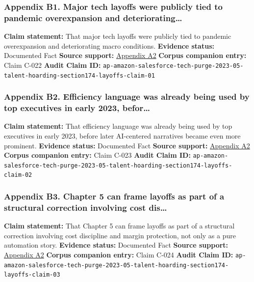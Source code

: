 \documentclass[
  american,
  11pt,
  letterpaper,
]{article}
\begin{document}
\subsubsection{Appendix B1. Major tech layoffs were publicly tied to
pandemic overexpansion and
deteriorating\ldots{}}\label{appendix-b1-major-tech-layoffs-were-publicly-tied-to-pandemic-overexpansion-and-deteriorating}

\textbf{Claim statement:} That major tech layoffs were publicly tied to
pandemic overexpansion and deteriorating macro conditions.
\textbf{Evidence status:} Documented Fact \textbf{Source support:}
\hyperref[appendix-a2-amazon-salesforce-jettison-jobs-in-latest-tech-worker-purge]{Appendix
A2} \textbf{Corpus companion entry:} Claim C-022 \textbf{Audit Claim
ID:}
\texttt{ap-amazon-salesforce-tech-purge-2023-05-talent-hoarding-section174-layoffs-claim-01}

\subsubsection{Appendix B2. Efficiency language was already being used
by top executives in early 2023,
befor\ldots{}}\label{appendix-b2-efficiency-language-was-already-being-used-by-top-executives-in-early-2023-befor}

\textbf{Claim statement:} That efficiency language was already being
used by top executives in early 2023, before later AI-centered
narratives became even more prominent. \textbf{Evidence status:}
Documented Fact \textbf{Source support:}
\hyperref[appendix-a2-amazon-salesforce-jettison-jobs-in-latest-tech-worker-purge]{Appendix
A2} \textbf{Corpus companion entry:} Claim C-023 \textbf{Audit Claim
ID:}
\texttt{ap-amazon-salesforce-tech-purge-2023-05-talent-hoarding-section174-layoffs-claim-02}

\subsubsection{Appendix B3. Chapter 5 can frame layoffs as part of a
structural correction involving cost
dis\ldots{}}\label{appendix-b3-chapter-5-can-frame-layoffs-as-part-of-a-structural-correction-involving-cost-dis}

\textbf{Claim statement:} That Chapter 5 can frame layoffs as part of a
structural correction involving cost discipline and margin protection,
not only as a pure automation story. \textbf{Evidence status:}
Documented Fact \textbf{Source support:}
\hyperref[appendix-a2-amazon-salesforce-jettison-jobs-in-latest-tech-worker-purge]{Appendix
A2} \textbf{Corpus companion entry:} Claim C-024 \textbf{Audit Claim
ID:}
\texttt{ap-amazon-salesforce-tech-purge-2023-05-talent-hoarding-section174-layoffs-claim-03}
\end{document}

